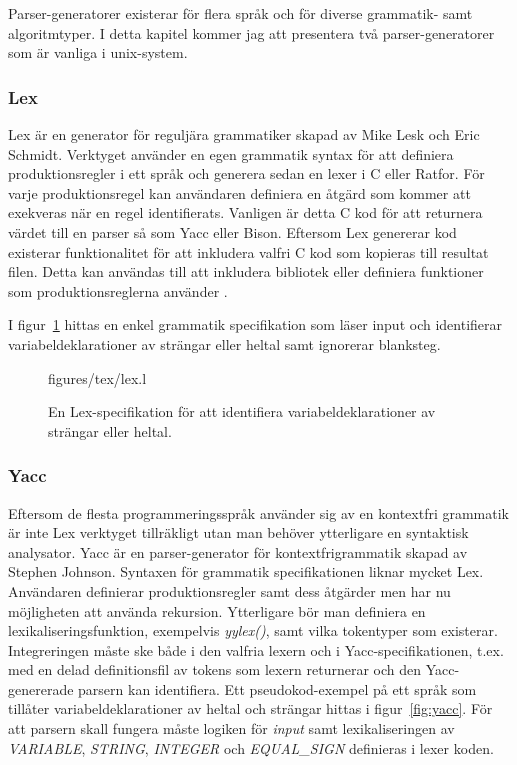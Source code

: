 Parser-generatorer existerar för flera språk och för diverse grammatik- samt
algoritmtyper. I detta kapitel kommer jag att presentera två
parser-generatorer som är vanliga i unix-system.

\subsubsection{Lex}

Lex är en generator för reguljära grammatiker skapad av Mike Lesk och
Eric Schmidt. Verktyget använder en egen grammatik syntax för att
definiera produktionsregler i ett språk och generera sedan en lexer i C eller
Ratfor. För varje produktionsregel kan användaren definiera en åtgärd som
kommer att exekveras när en regel identifierats. Vanligen är detta C kod för
att returnera värdet till en parser så som Yacc eller Bison. Eftersom Lex
genererar kod existerar funktionalitet för att inkludera valfri C kod som
kopieras till resultat filen. Detta kan användas till att inkludera bibliotek
eller definiera funktioner som produktionsreglerna använder \citep{lex}.

I figur~\ref{fig:lex} hittas en enkel grammatik specifikation som läser input
och identifierar variabeldeklarationer av strängar eller heltal samt ignorerar
blanksteg.

\begin{figure}[ht]
    {figures/tex/lex.l}
  \caption{En Lex-specifikation för att identifiera variabeldeklarationer av
    strängar eller heltal.}
  \label{fig:lex}
\end{figure}

\subsubsection{Yacc}

Eftersom de flesta programmeringsspråk använder sig av en kontextfri grammatik
är inte Lex verktyget tillräkligt utan man behöver ytterligare en syntaktisk
analysator. Yacc är en parser-generator för kontextfrigrammatik skapad av
Stephen Johnson. Syntaxen för grammatik specifikationen liknar mycket Lex.
Användaren definierar produktionsregler samt dess åtgärder men har nu
möjligheten att använda rekursion. Ytterligare bör man definiera en
lexikaliseringsfunktion, exempelvis \textit{yylex()}, samt vilka tokentyper
som existerar. Integreringen måste ske både i den valfria lexern och i
Yacc-specifikationen, t.ex. med en delad definitionsfil av tokens som lexern
returnerar och den Yacc-genererade parsern kan identifiera. Ett
pseudokod-exempel på ett språk som tillåter variabeldeklarationer av heltal
och strängar hittas i figur~\ref{fig:yacc}. För att parsern skall fungera
måste logiken för \textit{input} samt lexikaliseringen av \textit{VARIABLE},
\textit{STRING},
\textit{INTEGER} och \textit{EQUAL_SIGN} definieras i lexer koden.

